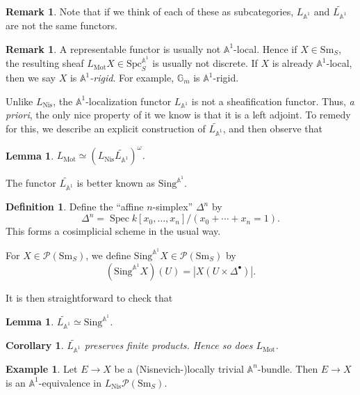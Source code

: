 \documentclass{shortart}
\newtheorem{lemma}[thm]{Lemma}
\newtheorem{cor}[thm]{Corollary}
\theoremstyle{definition}
\newtheorem{defi}[thm]{Definition}
\newtheorem{remark}[thm]{Remark}
\newtheorem{eg}[thm]{Example}
\newcommand\Sm{\mathrm{Sm}}
\newcommand\Spc{\mathrm{Spc}}
\newcommand\Sing{\mathrm{Sing}}
\newcommand\Nis{\mathrm{Nis}}
\newcommand\Pre{\mathcal{P}}
\newcommand\A{\mathbb{A}}
\newcommand\G{\mathbb{G}}
\newcommand\Mot{\mathrm{Mot}}
\DeclareMathOperator\Spec{Spec}
\begin{document}
\begin{remark}
  Note that if we think of each of these as subcategories, $L_{\A^1}$ and $\widetilde{L_{\A^1}}$ are not the same functors.
\end{remark}

\begin{remark}
  A representable functor is usually not $\A^1$-local. Hence if $X \in \Sm_S$, the resulting sheaf $L_{\Mot} X \in \Spc_S^{\A^1}$ is usually not discrete. If $X$ is already $\A^1$-local, then we say $X$ is \emph{$\A^1$-rigid}. For example, $\G_m$ is $\A^1$-rigid.
\end{remark}
Unlike $L_{\Nis}$, the $\A^1$-localization functor $L_{\A^1}$ is not a sheafification functor. Thus, \emph{a priori}, the only nice property of it we know is that it is a left adjoint. To remedy for this, we describe an explicit construction of $\widetilde{L_{\A^1}}$, and then observe that
\begin{lemma}
  $L_{\Mot} \simeq (L_{\Nis} \widetilde{L_{\A^1}})^{\omega}$.
\end{lemma}

The functor $\widetilde{L_{\A^1}}$ is better known as $\Sing^{\A^1}$.

\begin{defi}
  Define the ``affine $n$-simplex'' $\Delta^n$ by
  \[
    \Delta^n = \Spec k[x_0, \ldots, x_n]/(x_0 + \cdots + x_n = 1).
  \]
  This forms a cosimplicial scheme in the usual way.

  For $X \in \Pre(\Sm_S)$, we define $\Sing^{\A^1}X \in \Pre(\Sm_S)$ by
  \[
    (\Sing^{\A^1}X)(U) = |X(U \times \Delta^\bullet)|.
  \]
\end{defi}

It is then straightforward to check that
\begin{lemma}
  $\widetilde{L_{\A^1}} \simeq \Sing^{\A^1}$.
\end{lemma}

\begin{cor}
  $\widetilde{L_{\A^1}}$ preserves finite products. Hence so does $L_{\Mot}$.
\end{cor}

\begin{eg}
  Let $E \to X$ be a (Nisnevich-)locally trivial $\A^n$-bundle. Then $E \to X$ is an $\A^1$-equivalence in $L_{\Nis}\Pre(\Sm_S)$.
\end{eg}
\end{document}

